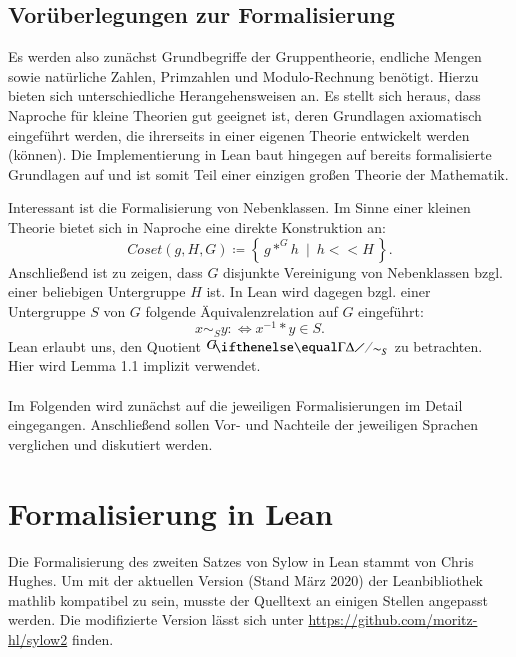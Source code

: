 \documentclass[a4paper,12pt]{scrartcl}
\newcommand{\st}{\ \mid\ }
\begin{document}
\subsection{Vorüberlegungen zur Formalisierung}
Es werden also zunächst Grundbegriffe der Gruppentheorie, endliche Mengen sowie natürliche Zahlen, Primzahlen und Modulo-Rechnung benötigt. Hierzu bieten sich unterschiedliche Herangehensweisen an. 
Es stellt sich heraus, dass Naproche für kleine Theorien gut geeignet ist, deren Grundlagen axiomatisch eingeführt werden, die ihrerseits in einer eigenen Theorie entwickelt werden (können). Die Implementierung in Lean baut hingegen auf bereits formalisierte Grundlagen auf und ist somit Teil einer einzigen großen Theorie der Mathematik. 

Interessant ist die Formalisierung von Nebenklassen. Im Sinne einer kleinen Theorie bietet sich in Naproche eine direkte Konstruktion an: $$Coset\left(g, H, G\right) \coloneqq \left\{\,g *^{G} h \st h << H\,\right\}.$$ Anschließend ist zu zeigen, dass $G$ disjunkte Vereinigung von Nebenklassen bzgl. einer beliebigen Untergruppe $H$ ist.
In Lean wird dagegen bzgl. einer Untergruppe $S$ von $G$ folgende Äquivalenzrelation auf $G$ eingeführt: $$x\sim_{S} y :\Leftrightarrow x^{-1}*y\in S.$$
Lean erlaubt uns, den Quotient $\fkr{G}{\sim_{S}}[-0.2]$ zu betrachten. Hier wird Lemma 1.1 implizit verwendet.
\paragraph*{}
Im Folgenden wird zunächst auf die jeweiligen Formalisierungen im Detail eingegangen. Anschließend sollen Vor- und Nachteile der jeweiligen Sprachen verglichen und diskutiert werden.


\newpage
\section{Formalisierung in Lean}

Die Formalisierung des zweiten Satzes von Sylow in Lean stammt von Chris Hughes\cite{bibtex.c}.
Um mit der aktuellen Version (Stand März 2020) der Leanbibliothek mathlib \cite{bibtex.d} kompatibel zu sein, musste der Quelltext an einigen Stellen angepasst werden. Die modifizierte Version lässt sich unter \url{https://github.com/moritz-hl/sylow2} \cite{bibtex.h} finden.
\end{document}

